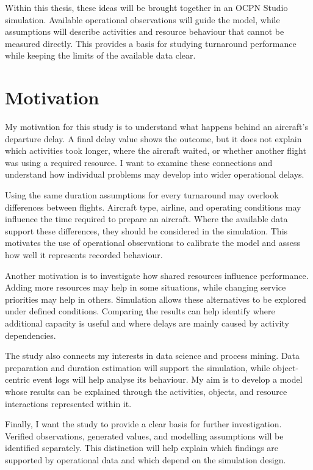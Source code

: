 Within this thesis, these ideas will be brought together in an OCPN Studio simulation. Available operational observations will guide the model, while assumptions will describe activities and resource behaviour that cannot be measured directly. This provides a basis for studying turnaround performance while keeping the limits of the available data clear.


\section{Motivation}

My motivation for this study is to understand what happens behind an aircraft’s departure delay. A final delay value shows the outcome, but it does not explain which activities took longer, where the aircraft waited, or whether another flight was using a required resource. I want to examine these connections and understand how individual problems may develop into wider operational delays.

Using the same duration assumptions for every turnaround may overlook differences between flights. Aircraft type, airline, and operating conditions may influence the time required to prepare an aircraft. Where the available data support these differences, they should be considered in the simulation. This motivates the use of operational observations to calibrate the model and assess how well it represents recorded behaviour.

Another motivation is to investigate how shared resources influence performance. Adding more resources may help in some situations, while changing service priorities may help in others. Simulation allows these alternatives to be explored under defined conditions. Comparing the results can help identify where additional capacity is useful and where delays are mainly caused by activity dependencies.

The study also connects my interests in data science and process mining. Data preparation and duration estimation will support the simulation, while object-centric event logs will help analyse its behaviour. My aim is to develop a model whose results can be explained through the activities, objects, and resource interactions represented within it.

Finally, I want the study to provide a clear basis for further investigation. Verified observations, generated values, and modelling assumptions will be identified separately. This distinction will help explain which findings are supported by operational data and which depend on the simulation design.


